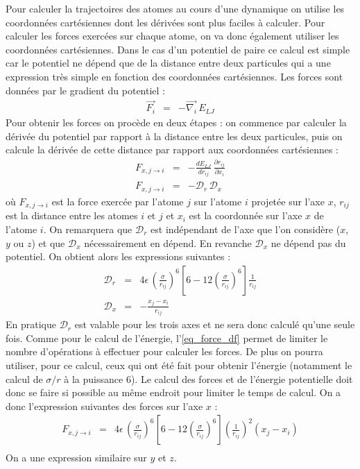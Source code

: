 \documentclass[11pt,a4paper,fleqn]{book}
\begin{document}
Pour calculer la trajectoires des atomes au cours d'une dynamique on utilise 
les coordonnées cartésiennes dont les dérivées sont plus faciles à calculer.
Pour calculer les forces exercées sur chaque atome, on va donc également utiliser
les coordonnées cartésiennes. Dans le cas d'un potentiel de paire ce calcul est
simple car le potentiel ne dépend que de la distance entre deux particules qui
a une expression très simple en fonction des coordonnées cartésiennes. Les forces
sont données par le gradient du potentiel :
%
\begin{eqnarray}
	\overrightarrow{F_i} & = & - \overrightarrow{\nabla_i} \, E_{LJ}
\end{eqnarray}
%
Pour obtenir les forces on procède en deux étapes : on commence par
calculer la dérivée du potentiel par rapport à la distance entre les
deux particules, puis on calcule la dérivée de cette distance par rapport
aux coordonnées cartésiennes :
%
\begin{eqnarray*}
	F_{x,j\rightarrow i} & = & -\frac{d E_{LJ}}{d r_{ij}}\,\frac{\partial r_{ij}}{\partial x_i} \\
	F_{x,j\rightarrow i} & = & -\mathcal{D}_r \, \mathcal{D}_x
\end{eqnarray*}
%
où $F_{x,j\rightarrow i}$ est la force exercée par l'atome $j$ sur l'atome $i$ projetée
sur l'axe $x$, $r_{ij}$ est la distance entre les atomes $i$ et $j$ et $x_i$ est
la coordonnée sur l'axe $x$ de l'atome $i$. On remarquera que $\mathcal{D}_r$ est
indépendant de l'axe que l'on considère ($x$, $y$ ou $z$) et que $\mathcal{D}_x$
nécessairement en dépend. En revanche $\mathcal{D}_x$ ne dépend pas du potentiel. 
On obtient alors les expressions suivantes :
%
\begin{eqnarray}
	\mathcal{D}_r & = &  4 \epsilon \, \left(\frac{\sigma}{r_{ij}}\right)^6
		\left[ 6 - 12 \left(\frac{\sigma}{r_{ij}}\right)^6 
		\right]\frac{1}{r_{ij}} \label{eq_force_df}\\
	\mathcal{D}_x & = & - \frac{x_j-x_i}{r_{ij}} \label{eq_force_axe}
\end{eqnarray}
%
En pratique $\mathcal{D}_r$ est valable pour les trois
axes et ne sera donc calculé qu'une seule fois.
Comme pour le calcul de l'énergie, l'\ref{eq_force_df}
permet de limiter le nombre d'opérations à effectuer pour calculer les forces. 
De plus on pourra utiliser, pour ce calcul, ceux qui ont été
fait pour obtenir l'énergie (notamment le calcul de $\sigma/r$ à la puissance
6). Le calcul des forces et de l'énergie potentielle doit donc se faire 
si possible au même endroit pour limiter le temps de calcul. 
On a donc l'expression suivantes des forces sur l'axe $x$ :
%
\begin{eqnarray*}
	F_{x,j\rightarrow i} & = & 4 \epsilon \, \left(\frac{\sigma}{r_{ij}}\right)^6
		\left[ 6 - 12 \left(\frac{\sigma}{r_{ij}}\right)^6 
		\right]\left(\frac{1}{r_{ij}}\right)^2 
		\left(x_j-x_i\right)\\
\end{eqnarray*}
%
On a une expression similaire sur $y$ et $z$.
\end{document}
